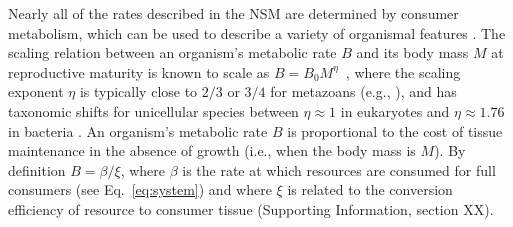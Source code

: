 \documentclass{pnastwo}
\begin{document}
\begin{article}
Nearly all of the rates described in the NSM are determined by consumer
metabolism, which can be used to describe a variety of organismal features
\cite{Brown:2004wq}.  The scaling relation between an organism's metabolic
rate $B$ and its body mass $M$ at reproductive maturity is known to scale as
$B = B_0 M^\eta$~\cite{West:2002it}, where the scaling exponent $\eta$ is
typically close to $2/3$ or $3/4$ for metazoans (e.g., \cite{Brown:2004wq}),
and has taxonomic shifts for unicellular species between $\eta\approx 1$ in
eukaryotes and $\eta\approx 1.76$ in bacteria
\cite{DeLong:2010dy,Kempes:2012hy}.
An organism's metabolic rate $B$ is proportional to the cost of tissue
maintenance in the absence of growth (i.e., when the body mass is $M$).  By
definition $B=\beta/\xi$, where $\beta$ is the rate at which resources are
consumed for full consumers (see Eq.~\eqref{eq:system}) and where $\xi$ is
related to the conversion efficiency of resource to consumer tissue
(Supporting Information, section XX).


\end{article}
\end{document}
